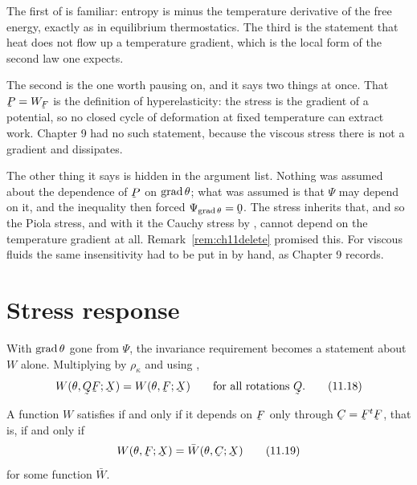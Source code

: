 \begin{remark}%
\label{rem:ch11three}
The first of  is familiar: entropy is minus the temperature
derivative of the free energy, exactly as in equilibrium thermostatics.
The third is the statement that heat does not flow up a temperature
gradient, which is the local form of the second law one expects.

The second is the one worth pausing on, and it says two things at once.
That $\bP=W_{\bF}$ is the definition of hyperelasticity: the stress is
the gradient of a potential, so no closed cycle of deformation at fixed
temperature can extract work. Chapter 9 had no such statement, because
the viscous stress there is not a gradient and dissipates.

The other thing it says is hidden in the argument list. Nothing was
assumed about the dependence of $\bP$ on $\operatorname{grad}\theta$; what was assumed
is that $\Psi$ may depend on it, and the inequality then forced
$\Psi_{\grad\theta}=\bze$. The stress inherits that, and so the Piola
stress, and with it the Cauchy stress by , cannot depend on
the temperature gradient at all. Remark~\ref{rem:ch11delete} promised
this. For viscous fluids the same insensitivity had to be put in by
hand, as Chapter 9 records.
\end{remark}

\section{Stress response}\label{sec:ch11stress}

With $\operatorname{grad}\theta$ gone from $\Psi$, the invariance requirement
 becomes a statement about $W$ alone. Multiplying 
by $\rho_{\kappa}$ and using ,
\begin{equation}
   W(\theta,\bQ\bF;\bX)=W(\theta,\bF;\bX)
   \qquad\text{for all rotations }\bQ .
   \tag{11.18}\label{eq:11.18}
\end{equation}

\begin{proposition}\label{prop:ch11WC}
A function $W$ satisfies  if and only if it depends on $\bF$
only through $\bC=\bF^{t}\bF$, that is, if and only if
\begin{equation}
   W(\theta,\bF;\bX)=\bar W(\theta,\bC;\bX)
   \tag{11.19}\label{eq:11.19}
\end{equation}
for some function $\bar W$.
\end{proposition}

